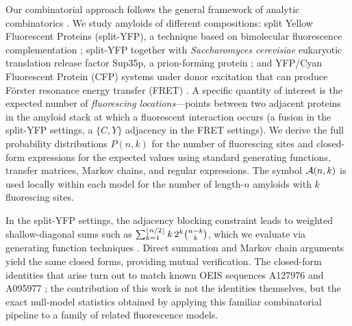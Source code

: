 \documentclass[11pt]{article}
\DeclarePairedDelimiter\floor{\lfloor}{\rfloor}
\newcommand{\cA}{ {\cal A} }
\begin{document}
Our combinatorial approach follows the general framework of analytic combinatorics \cite[Ch.~I]{flajolet2009}. We study amyloids of different compositions: split Yellow Fluorescent Proteins (split-YFP), a technique based on bimolecular fluorescence complementation \cite{hu2002,kerppola2006}; split-YFP together with \textit{Saccharomyces cerevisiae} eukaryotic translation release factor Sup35p, a prion-forming protein \cite{patino1996}; and YFP/Cyan Fluorescent Protein (CFP) systems under donor excitation that can produce F\"{o}rster resonance energy transfer (FRET) \cite{forster1948,patterson2000}. A specific quantity of interest is the expected number of \textit{fluorescing locations}---points between two adjacent proteins in the amyloid stack at which a fluorescent interaction occurs (a fusion in the split-YFP settings, a $\{C, Y\}$ adjacency in the FRET settings). We derive the full probability distributions $P(n,k)$ for the number of fluorescing sites and closed-form expressions for the expected values using standard generating functions, transfer matrices, Markov chains, and regular expressions. The symbol $\cA(n,k)$ is used locally within each model for the number of length-$n$ amyloids with $k$ fluorescing sites.

In the split-YFP settings, the adjacency blocking constraint leads to weighted shallow-diagonal sums such as $\sum_{k=1}^{\floor{n/2}} k\, 2^k \binom{n-k}{k}$, which we evaluate via generating function techniques \cite{wilf2006}. Direct summation and Markov chain arguments yield the same closed forms, providing mutual verification. The closed-form identities that arise turn out to match known OEIS sequences A127976 and A095977 \cite{oeisA127976,oeisA095977}; the contribution of this work is not the identities themselves, but the exact null-model statistics obtained by applying this familiar combinatorial pipeline to a family of related fluorescence models.
\end{document}
